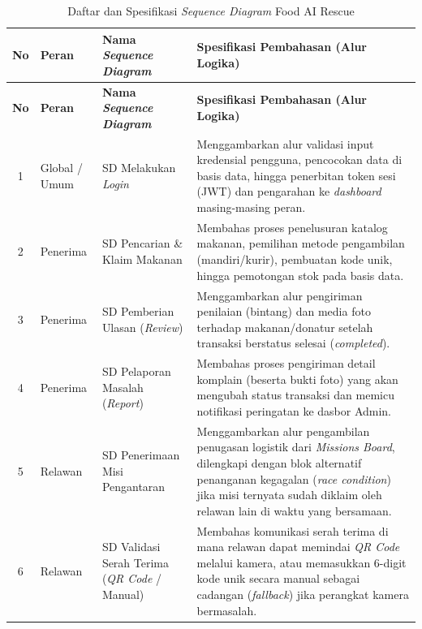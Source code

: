 \begin{xltabular}{\textwidth}{|c|L|L|X|}
    \caption{Daftar dan Spesifikasi \textit{Sequence Diagram} Food AI Rescue}
    \label{tab:ringkasan-sd} \\
    \hline
    \textbf{No} & \textbf{Peran} & \textbf{Nama \textit{Sequence Diagram}} & \textbf{Spesifikasi Pembahasan (Alur Logika)} \\
    \hline
    \endfirsthead
    \hline
    \textbf{No} & \textbf{Peran} & \textbf{Nama \textit{Sequence Diagram}} & \textbf{Spesifikasi Pembahasan (Alur Logika)} \\
    \hline
    \endhead
    \hline
    \endfoot
    \hline
    \endlastfoot

    1 & Global / Umum & SD Melakukan \textit{Login} & Menggambarkan alur validasi input kredensial pengguna, pencocokan data di basis data, hingga penerbitan token sesi (JWT) dan pengarahan ke \textit{dashboard} masing-masing peran. \\
    \hline

    2 & Penerima & SD Pencarian \& Klaim Makanan & Membahas proses penelusuran katalog makanan, pemilihan metode pengambilan (mandiri/kurir), pembuatan kode unik, hingga pemotongan stok pada basis data. \\
    \hline

    3 & Penerima & SD Pemberian Ulasan (\textit{Review}) & Menggambarkan alur pengiriman penilaian (bintang) dan media foto terhadap makanan/donatur setelah transaksi berstatus selesai (\textit{completed}). \\
    \hline

    4 & Penerima & SD Pelaporan Masalah (\textit{Report}) & Membahas proses pengiriman detail komplain (beserta bukti foto) yang akan mengubah status transaksi dan memicu notifikasi peringatan ke dasbor Admin. \\
    \hline

    5 & Relawan & SD Penerimaan Misi Pengantaran & Menggambarkan alur pengambilan penugasan logistik dari \textit{Missions Board}, dilengkapi dengan blok alternatif penanganan kegagalan (\textit{race condition}) jika misi ternyata sudah diklaim oleh relawan lain di waktu yang bersamaan. \\
    \hline

    6 & Relawan & SD Validasi Serah Terima (\textit{QR Code} / Manual) & Membahas komunikasi serah terima di mana relawan dapat memindai \textit{QR Code} melalui kamera, atau memasukkan 6-digit kode unik secara manual sebagai cadangan (\textit{fallback}) jika perangkat kamera bermasalah. \\
    \hline


\end{xltabular}
